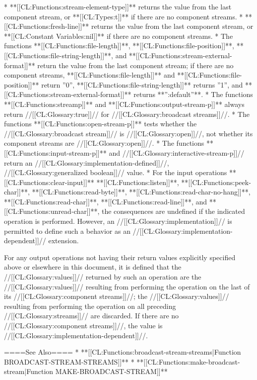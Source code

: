   * **[[CL:Functions:stream-element-type]]** returns the value from the last component stream, or **[[CL:Types:t]]** if there are no component streams.
  * **[[CL:Functions:fresh-line]]** returns the value from the last component stream, or **[[CL:Constant Variables:nil]]** if there are no component streams.
  * The functions **[[CL:Functions:file-length]]**, **[[CL:Functions:file-position]]**, **[[CL:Functions:file-string-length]]**, and **[[CL:Functions:stream-external-format]]** return the value from the last component stream; if there are no component streams, **[[CL:Functions:file-length]]** and **[[CL:Functions:file-position]]** return ''0'', **[[CL:Functions:file-string-length]]** returns ''1'', and **[[CL:Functions:stream-external-format]]** returns **'':default''**.
  * The functions **[[CL:Functions:streamp]]** and **[[CL:Functions:output-stream-p]]** always return //[[CL:Glossary:true]]// for //[[CL:Glossary:broadcast streams]]//.
  * The functions **[[CL:Functions:open-stream-p]]** tests whether the //[[CL:Glossary:broadcast stream]]// is //[[CL:Glossary:open]]//, not whether its component streams are //[[CL:Glossary:open]]//.
  * The functions **[[CL:Functions:input-stream-p]]** and //[[CL:Glossary:interactive-stream-p]]// return an //[[CL:Glossary:implementation-defined]]//, //[[CL:Glossary:generalized boolean]]// value.
  * For the input operations **[[CL:Functions:clear-input]]** **[[CL:Functions:listen]]**, **[[CL:Functions:peek-char]]**, **[[CL:Functions:read-byte]]**, **[[CL:Functions:read-char-no-hang]]**, **[[CL:Functions:read-char]]**, **[[CL:Functions:read-line]]**, and **[[CL:Functions:unread-char]]**, the consequences are undefined if the indicated operation is performed. However, an //[[CL:Glossary:implementation]]// is permitted to define such a behavior as an //[[CL:Glossary:implementation-dependent]]// extension.

For any output operations not having their return values explicitly specified above or elsewhere in this document, it is defined that the //[[CL:Glossary:values]]// returned by such an operation are the //[[CL:Glossary:values]]// resulting from performing the operation on the last of its //[[CL:Glossary:component streams]]//; the //[[CL:Glossary:values]]// resulting from performing the operation on all preceding //[[CL:Glossary:streams]]// are discarded. If there are no //[[CL:Glossary:component streams]]//, the value is //[[CL:Glossary:implementation-dependent]]//.

====See Also====
  * **[[CL:Functions:broadcast-stream-streams|Function BROADCAST-STREAM-STREAMS]]**
  * **[[CL:Functions:make-broadcast-stream|Function MAKE-BROADCAST-STREAM]]**

  
